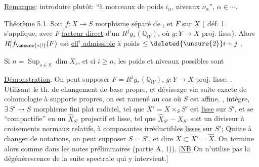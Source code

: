 \uline{Remarque}: introduire plutôt: ``à morceaux de poids $i_\alpha$, niveaux $\nu_\alpha$'', $\alpha\in\cdots$.

\uline{Théorème} 5.1. Soit $f:X\longrightarrow S$ morphisme séparé de  , et $F$ sur $X$     ( déf. 1  s'applique, avec $F$ \uline{facteur direct} d'un $R^j g_*(\mathbb Q_{lY})$, où $g:Y\longrightarrow X$  proj. lisse). Alors $R^i_!f_{\unsure{*|!}}(F)$ est \uline{eff$^{t}$ admissible}  à  poids $\leq\deleted{\unsure{2}}i+j$  .

Si $n=\operatorname{Sup}_{s\in S}\dim X_s$,  et si $i\geq n$, les poids  et niveaux  possibles sont


\uline{Démonstration}. On  peut supposer $F=R^j g_*(\mathbb Q_{lY})$, $g:Y\longrightarrow X$ proj. lisse. . Utilisant le th. de changement de base propre,  et dévissage via suite exacte de cohomologie à supports propres, on est ramené au cas où  $S$ est affine, , intègre,  $\exists\,S'\longrightarrow S$ morphisme fini plat radiciel, tel que $X' = X\times_S S'$ est \uline{lisse} sur $S'$, et se ``compactifie'' en un $\widehat X_{S'}$  projectif et lisse, tel que $\widehat X_{S'}-X_{S'}$ soit un diviseur à croisements normaux relatifs, à composantes irréductibles \uline{lisses} sur $S'$;  Quitte à changer de notations, on peut supposer $S=S'$, et dire $X\subset X'=\widehat X$. On termine alors  comme dans les notes préliminaires (partie A, 1)). [\uline{NB} On n'utilise pas la dégénérescence de la suite spectrale qui y intervient.]

